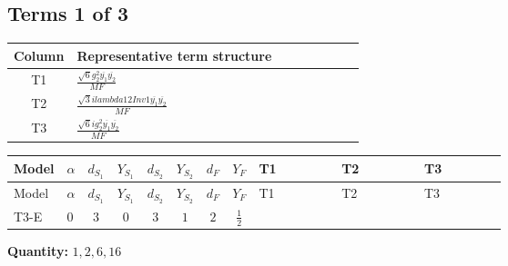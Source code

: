 \documentclass[8pt]{article}
\begin{document}
\begin{landscape}
\subsection*{Terms 1 of 3}
\begin{center}
\begin{tabular}{@{}c >{\raggedright\arraybackslash}p{0.82\linewidth}@{}}
\toprule
Column & Representative term structure \\
\midrule
T1 & \(\displaystyle \frac{\sqrt{6} g_{2}^{2} \overline{y_{1}} \overline{y_{2}}}{MF}\) \\
\midrule
T2 & \(\displaystyle \frac{\sqrt{3} i lambda12Inv1 \overline{y_{1}} \overline{y_{2}}}{MF}\) \\
\midrule
T3 & \(\displaystyle \frac{\sqrt{6} i g_{2}^{2} \overline{y_{1}} \overline{y_{2}}}{MF}\) \\
\midrule
\bottomrule
\end{tabular}
\end{center}
\smallskip
\tiny
\begin{longtable}{@{}llcccccc >{\raggedright\arraybackslash}p{0.21\linewidth} >{\raggedright\arraybackslash}p{0.21\linewidth} >{\raggedright\arraybackslash}p{0.21\linewidth}@{}}
\toprule
Model & $\alpha$ & $d_{S_1}$ & $Y_{S_1}$ & $d_{S_2}$ & $Y_{S_2}$ & $d_F$ & $Y_F$ & T1 & T2 & T3 \\
\midrule
\endfirsthead
\toprule
Model & $\alpha$ & $d_{S_1}$ & $Y_{S_1}$ & $d_{S_2}$ & $Y_{S_2}$ & $d_F$ & $Y_F$ & T1 & T2 & T3 \\
\midrule
\endhead
T3-E & $0$ & $3$ & $0$ & $3$ & $1$ & $2$ & $\frac{1}{2}$ & \scriptsize\adjustbox{max width=\linewidth}{$\begin{gathered} - \frac{\sqrt{6} g_{2}^{2} \overline{y_{1}} \overline{y_{2}}}{6 MF}\end{gathered}$} & \scriptsize\adjustbox{max width=\linewidth}{$\begin{gathered} - \frac{\sqrt{3} i lambda12Inv1 \overline{y_{1}} \overline{y_{2}}}{6 MF}\end{gathered}$} & \scriptsize\adjustbox{max width=\linewidth}{$\begin{gathered} \frac{\sqrt{6} i g_{2}^{2} \overline{y_{1}} \overline{y_{2}}}{6 MF}\end{gathered}$} \\
\midrule
\bottomrule
\end{longtable}
\clearpage
\noindent\textbf{Quantity: }$\mathrm{1,2,6,16}$\par\smallskip

\end{landscape}
\end{document}
